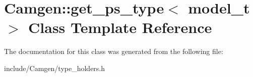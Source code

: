 \hypertarget{a00249}{}\section{Camgen\+:\+:get\+\_\+ps\+\_\+type$<$ model\+\_\+t $>$ Class Template Reference}
\label{a00249}


The documentation for this class was generated from the following file\+:\begin{DoxyCompactItemize}
\item 
include/\+Camgen/type\+\_\+holders.\+h\end{DoxyCompactItemize}
